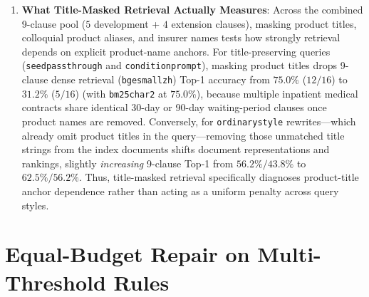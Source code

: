 \documentclass[10pt,twocolumn]{article}
\renewcommand{\_}{\textunderscore\allowbreak}
\begin{document}
\begin{enumerate}[leftmargin=*,nosep]
  \item \textbf{What Title-Masked Retrieval Actually Measures}: Across the combined 9-clause pool ($5$ development + $4$ extension clauses), masking product titles, colloquial product aliases, and insurer names tests how strongly retrieval depends on explicit product-name anchors. For title-preserving queries (\texttt{seed\_passthrough} and \texttt{condition\_prompt}), masking product titles drops 9-clause dense retrieval (\texttt{bge\_small\_zh}) Top-1 accuracy from $75.0\%$ ($12/16$) to $31.2\%$ ($5/16$) (with \texttt{bm25\_char2} at $75.0\%$), because multiple inpatient medical contracts share identical 30-day or 90-day waiting-period clauses once product names are removed. Conversely, for \texttt{ordinary\_style} rewrites---which already omit product titles in the query---removing those unmatched title strings from the index documents shifts document representations and rankings, slightly \emph{increasing} 9-clause Top-1 from $56.2\% / 43.8\%$ to $62.5\% / 56.2\%$. Thus, title-masked retrieval specifically diagnoses product-title anchor dependence rather than acting as a uniform penalty across query styles.
\end{enumerate}

\section{Equal-Budget Repair on Multi-Threshold Rules}
\label{sec:multithreshold}
\end{document}
